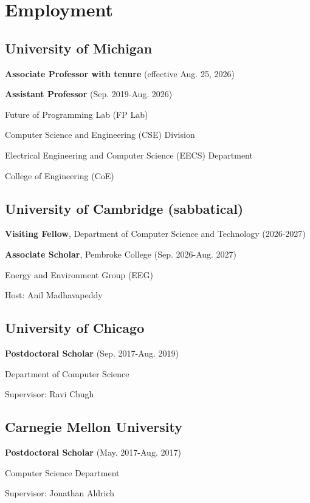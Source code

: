\documentclass[10pt,letterpaper]{article}
\renewenvironment{itemize}{
  \begin{list}{}{
    \setlength{\leftmargin}{1.25em}
    \setlength{\itemsep}{0.25em}
    \setlength{\parskip}{0pt}
    \setlength{\parsep}{0.2em}
  }
}{
  \end{list}
}
\begin{document}
\section*{Employment}

\subsection*{University of Michigan}
\begin{itemize}
  \item \textbf{Associate Professor with tenure} (effective Aug. 25, 2026)
  \item \textbf{Assistant Professor} (Sep. 2019-Aug. 2026)
  \item Future of Programming Lab (FP Lab)
  \item Computer Science and Engineering (CSE) Division
  \item Electrical Engineering and Computer Science (EECS) Department
  \item College of Engineering (CoE)
\end{itemize}

\subsection*{University of Cambridge (sabbatical)}
\begin{itemize}
  \item \textbf{Visiting Fellow}, Department of Computer Science and Technology (2026-2027)
  \item \textbf{Associate Scholar}, Pembroke College (Sep. 2026-Aug. 2027)
  \item Energy and Environment Group (EEG)
  \item Host: Anil Madhavapeddy
\end{itemize}

\subsection*{University of Chicago}
\begin{itemize}
  \item \textbf{Postdoctoral Scholar} (Sep. 2017-Aug. 2019)
  \item Department of Computer Science
  \item Supervisor: Ravi Chugh
\end{itemize}

\subsection*{Carnegie Mellon University}
\begin{itemize}
  \item \textbf{Postdoctoral Scholar} (May. 2017-Aug. 2017)
  \item Computer Science Department
  \item Supervisor: Jonathan Aldrich
\end{itemize}
\end{document}

